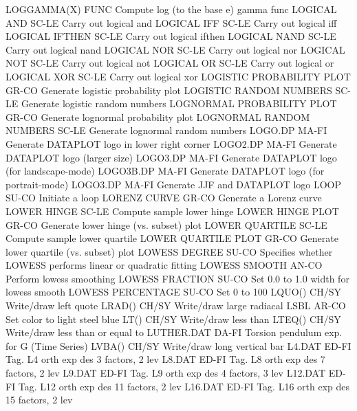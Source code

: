 LOGGAMMA(X)                 FUNC  Compute log (to the base e) gamma func
LOGICAL AND                 SC-LE Carry out logical and
LOGICAL IFF                 SC-LE Carry out logical iff
LOGICAL IFTHEN              SC-LE Carry out logical ifthen
LOGICAL NAND                SC-LE Carry out logical nand
LOGICAL NOR                 SC-LE Carry out logical nor
LOGICAL NOT                 SC-LE Carry out logical not
LOGICAL OR                  SC-LE Carry out logical or
LOGICAL XOR                 SC-LE Carry out logical xor
LOGISTIC PROBABILITY PLOT   GR-CO Generate logistic probability plot
LOGISTIC RANDOM NUMBERS     SC-LE Generate logistic random numbers
LOGNORMAL PROBABILITY PLOT  GR-CO Generate lognormal probability plot
LOGNORMAL RANDOM NUMBERS    SC-LE Generate lognormal random numbers
LOGO.DP                     MA-FI Generate DATAPLOT logo in lower right corner
LOGO2.DP                    MA-FI Generate DATAPLOT logo (larger size)
LOGO3.DP                    MA-FI Generate DATAPLOT logo (for landscape-mode)
LOGO3B.DP                   MA-FI Generate DATAPLOT logo (for portrait-mode)
LOGO3.DP                    MA-FI Generate JJF and DATAPLOT logo
LOOP                        SU-CO Initiate a loop
LORENZ CURVE                GR-CO Generate a Lorenz curve
LOWER HINGE                 SC-LE Compute sample lower hinge
LOWER HINGE PLOT            GR-CO Generate lower hinge (vs. subset) plot
LOWER QUARTILE              SC-LE Compute sample lower quartile
LOWER QUARTILE PLOT         GR-CO Generate lower quartile (vs. subset) plot
LOWESS DEGREE               SU-CO Specifies whether LOWESS performs linear or quadratic fitting
LOWESS SMOOTH               AN-CO Perform lowess smoothing
LOWESS FRACTION             SU-CO Set 0.0 to 1.0 width for lowess smooth
LOWESS PERCENTAGE           SU-CO Set 0 to 100%
LQUO()                      CH/SY Write/draw left quote
LRAD()                      CH/SY Write/draw large radiacal
LSBL                        AR-CO Set color to light steel blue
LT()                        CH/SY Write/draw less than
LTEQ()                      CH/SY Write/draw less than or equal to
LUTHER.DAT                  DA-FI Torsion pendulum exp. for G (Time Series)
LVBA()                      CH/SY Write/draw long vertical bar
L4.DAT                      ED-FI Tag. L4   orth exp des  3 factors,   2 lev
L8.DAT                      ED-FI Tag. L8   orth exp des  7 factors,   2 lev
L9.DAT                      ED-FI Tag. L9   orth exp des  4 factors,   3 lev
L12.DAT                     ED-FI Tag. L12  orth exp des 11 factors,   2 lev
L16.DAT                     ED-FI Tag. L16  orth exp des 15 factors,   2 lev
